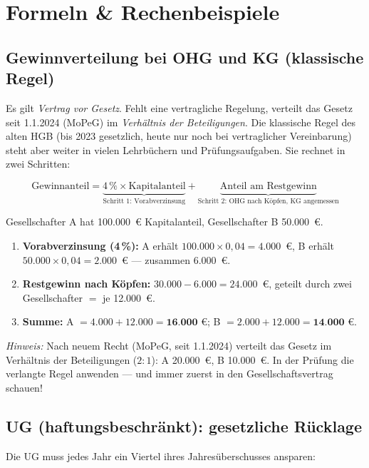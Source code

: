 \documentclass[11pt, a4paper]{article}
\begin{document}
\section{Formeln \& Rechenbeispiele}

\subsection{Gewinnverteilung bei OHG und KG (klassische Regel)}

Es gilt \emph{Vertrag vor Gesetz}. Fehlt eine vertragliche Regelung, verteilt das Gesetz
seit 1.1.2024 (MoPeG) im \emph{Verhältnis der Beteiligungen}. Die klassische Regel des
alten HGB (bis 2023 gesetzlich, heute nur noch bei vertraglicher Vereinbarung) steht aber
weiter in vielen Lehrbüchern und Prüfungsaufgaben. Sie rechnet in zwei Schritten:

\[
\textrm{Gewinnanteil} = \underbrace{4\,\% \times \textrm{Kapitalanteil}}_{\textrm{Schritt 1: Vorabverzinsung}}
+ \underbrace{\textrm{Anteil am Restgewinn}}_{\textrm{Schritt 2: OHG nach Köpfen, KG angemessen}}
\]

\begin{beispiel}[title={\bfseries Zahlenbeispiel: OHG mit 30.000~€ Gewinn}]
Gesellschafter A hat 100.000~€ Kapitalanteil, Gesellschafter B 50.000~€.
\begin{enumerate}
  \item \textbf{Vorabverzinsung (4\,\%):} A erhält $100.000 \times 0{,}04 = 4.000$~€,
    B erhält $50.000 \times 0{,}04 = 2.000$~€ --- zusammen 6.000~€.
  \item \textbf{Restgewinn nach Köpfen:} $30.000 - 6.000 = 24.000$~€, geteilt durch
    zwei Gesellschafter $=$ je 12.000~€.
  \item \textbf{Summe:} A $= 4.000 + 12.000 = \textbf{16.000~€}$;
    B $= 2.000 + 12.000 = \textbf{14.000~€}$.
\end{enumerate}
\emph{Hinweis:} Nach neuem Recht (MoPeG, seit 1.1.2024) verteilt das Gesetz im
Verhältnis der Beteiligungen ($2:1$): A 20.000~€, B 10.000~€. In der Prüfung die
verlangte Regel anwenden --- und immer zuerst in den Gesellschaftsvertrag schauen!
\end{beispiel}

\subsection{UG (haftungsbeschränkt): gesetzliche Rücklage}

Die UG muss jedes Jahr ein Viertel ihres Jahresüberschusses ansparen:
\end{document}
